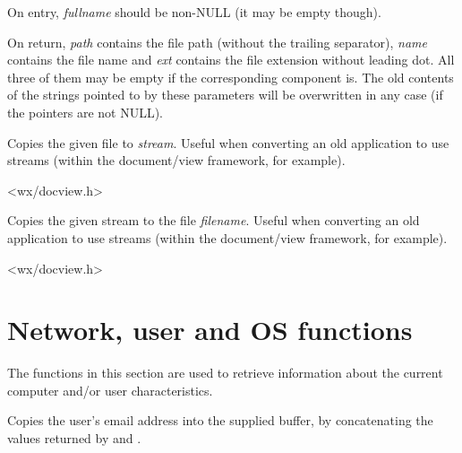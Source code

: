 On entry, {\it fullname} should be non-NULL (it may be empty though).

On return, {\it path} contains the file path (without the trailing separator), {\it name}
contains the file name and {\it ext} contains the file extension without leading dot. All
three of them may be empty if the corresponding component is. The old contents of the
strings pointed to by these parameters will be overwritten in any case (if the pointers
are not NULL).


\label{wxtransferfiletostream}


Copies the given file to {\it stream}. Useful when converting an old application to
use streams (within the document/view framework, for example).


<wx/docview.h>


\label{wxtransferstreamtofile}


Copies the given stream to the file {\it filename}. Useful when converting an old application to
use streams (within the document/view framework, for example).


<wx/docview.h>



\section{Network, user and OS functions}\label{networkfunctions}

The functions in this section are used to retrieve information about the
current computer and/or user characteristics.


\label{wxgetemailaddress}



Copies the user's email address into the supplied buffer, by
concatenating the values returned by \rtfsp
and .

